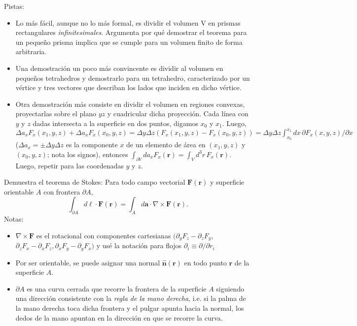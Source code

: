 \documentclass{exam}
\begin{document}
\begin{questions}
  Pistas:
  \begin{itemize}
  \item Lo más fácil, aunque no lo más formal, es dividir el volumen
    V en prismas rectangulares {\em infinitesimales}. Argumenta por qué
    demostrar el teorema para un pequeño prisma implica que se cumple
    para un volumen finito de forma arbitraria.
  \item   Una demostración un poco más convincente es dividir al volumen en
    pequeños tetrahedros y demostrarlo para un tetrahedro, caracterizado
    por un vértice y tres vectores que describan los lados que inciden
    en dicho vértice.
  \item   Otra demostración más consiste en dividir el volumen en regiones
    convexas, proyectarlas sobre el plano $yz$ y cuadricular dicha
    proyección. Cada línea con $y$ y $z$ dadas intersecta a la
    superficie en dos puntos, digamos $x_0$ y $x_1$. Luego, $\Delta a_x
    F_x(x_1,y,z)+\Delta a_x F_x(x_0,y,z)=\Delta y\Delta
    z(F_x(x_1,y,z)-F_x(x_0,y,z))=\Delta y\Delta z\int_{x_0}^{x_1} dx\,
    \partial F_x(x,y,z)/\partial x$ ($\Delta a_x=\pm\Delta y
    \Delta z$ es la componente $x$ de un elemento de área en $(x_1,y,z)$ y
    $(x_0,y,z)$; nota los signos), entonces $\int_{\partial
      V} da_x F_x(\bm r)=\int_V d^3r\, F_x(\bm r)$. Luego, repetir para
    las coordenadas $y$ y $z$.
  \end{itemize}
  \question Demuestra el teorema de Stokes: Para todo campo vectorial
  $\bm F(\bm r)$ y superficie orientable $A$ con frontera $\partial
  A$,
  $$
  \int_{\partial A}d\bm \ell\cdot\bm F(\bm r)=\int_A d\bm
  a\cdot\nabla\times\bm F(\bm r).
  $$
  Notas:
  \begin{itemize}
  \item $\nabla\times \bm F$ es el rotacional con componentes cartesianas
    $(\partial_yF_z-\partial_zF_y$, $\partial_z F_x-\partial_x F_z,
    \partial_x F_y-\partial_y F_x)$ y usé la notación para flojos
    $\partial_i\equiv\partial/\partial r_i$
  \item Por ser orientable, se puede asignar una normal $\hat
    {\bm n}(\bm r)$ en todo punto $\bm r$ de la superficie $A$.
  \item $\partial A$ es una curva cerrada que recorre la frontera de
    la superficie $A$ siguiendo una dirección consistente con la {\em
      regla de la mano derecha}, i.e. si la palma de la mano derecha
    toca dicha frontera y el pulgar apunta hacia la normal, los dedos de
    la mano apuntan en la dirección en que se recorre la curva.

\end{itemize}
\end{questions}
\end{document}
